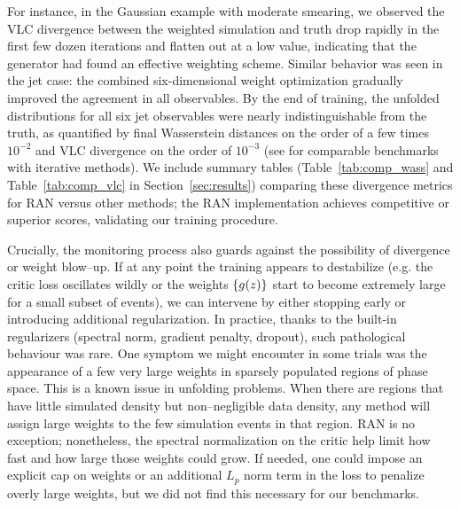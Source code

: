 {{        For instance, in the Gaussian example with moderate smearing, we observed the VLC divergence between the weighted simulation and truth drop rapidly in the first few dozen iterations and flatten out at a low value, indicating that the generator had found an effective weighting scheme.
        Similar behavior was seen in the jet case: the combined six-dimensional weight optimization gradually improved the agreement in all observables.
        By the end of training, the unfolded distributions for all six jet observables were nearly indistinguishable from the truth, as quantified by final Wasserstein distances on the order of a few times $10^{-2}$ and VLC divergence on the order of $10^{-3}$ (see  for comparable benchmarks with iterative methods).
        We include summary tables (Table~\ref{tab:comp_wass} and Table~\ref{tab:comp_vlc} in Section~\ref{sec:results}) comparing these divergence metrics for RAN versus other methods; the RAN implementation achieves competitive or superior scores, validating our training procedure.

        Crucially, the monitoring process also guards against the possibility of divergence or weight blow--up.
        If at any point the training appears to destabilize (e.g. the critic loss oscillates wildly or the weights $\qty{g(z)}$ start to become extremely large for a small subset of events), we can intervene by either stopping early or introducing additional regularization.
        In practice, thanks to the built-in regularizers (spectral norm, gradient penalty, dropout), such pathological behaviour was rare.
        One symptom we might encounter in some trials was the appearance of a few very large weights in sparsely populated regions of phase space.
        This is a known issue in unfolding problems.
        When there are regions that have little simulated density but non--negligible data density, any method will assign large weights to the few simulation events in that region.
        RAN is no exception;
        nonetheless, the spectral normalization on the critic help limit how fast and how large those weights could grow.
        If needed, one could impose an explicit cap on weights or an additional \(L_p\) norm term in the loss to penalize overly large weights, but we did not find this necessary for our benchmarks.

}}
